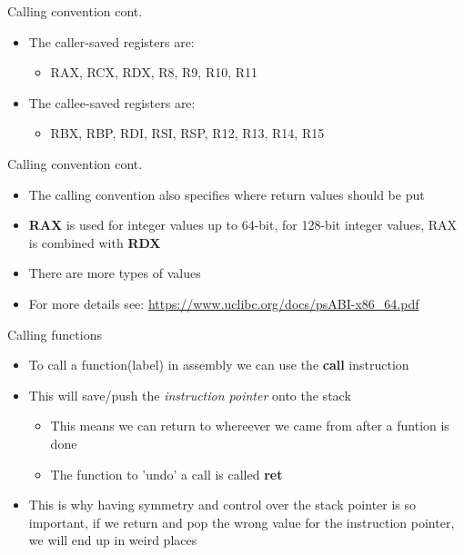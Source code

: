 \documentclass[
	11pt, %
	aspectratio=169, %
]{beamer}
\begin{document}
\begin{frame}{Calling convention cont.}{\sectiontitle}
    \begin{itemize}
        \item The caller-saved registers are:
              \begin{itemize}
                  \item RAX, RCX, RDX, R8, R9, R10, R11
              \end{itemize}
        \item The callee-saved registers are:
              \begin{itemize}
                  \item RBX, RBP, RDI, RSI, RSP, R12, R13, R14, R15
              \end{itemize}
    \end{itemize}
\end{frame}


\begin{frame}{Calling convention cont.}{\sectiontitle}
    \begin{itemize}
        \item The calling convention also specifies where return values should be put
        \item \textbf{RAX} is used for integer values up to 64-bit, for 128-bit integer values, RAX is combined with \textbf{RDX}
        \item There are more types of values
        \item For more details see: \url{https://www.uclibc.org/docs/psABI-x86_64.pdf}
    \end{itemize}

\end{frame}


\begin{frame}{Calling functions}{\sectiontitle}
    \begin{itemize}
        \item To call a function(label) in assembly we can use the \textbf{call} instruction
        \item This will save/push the \textit{instruction pointer} onto the stack
              \begin{itemize}
                  \item This means we can return to whereever we came from after a funtion is done
                  \item The function to 'undo' a call is called \textbf{ret}
              \end{itemize}
        \item This is why having symmetry and control over the stack pointer is so important, if we return and pop the wrong value for the instruction pointer, we will end up in weird places
    \end{itemize}
\end{frame}
\end{document}
